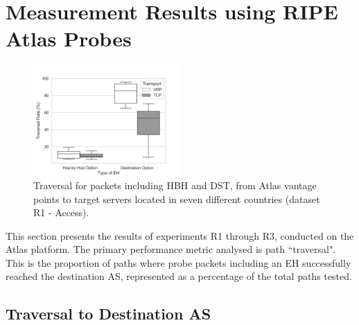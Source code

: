 \documentclass[conference]{IEEEtran}
\begin{document}




\section{Measurement Results using RIPE Atlas Probes} 
\label{sec:ripe-results}

\begin{figure}[t]
\centering
  \includegraphics[width=0.5\textwidth]{all_traversal.png}
  \caption{Traversal for packets including HBH and DST, from Atlas vantage points to target servers located in seven different countries (dataset R1 - Access).}
  \label{fig:countrybox}
\end{figure}

This section presents the results of experiments R1 through R3, conducted on the Atlas platform. 
The primary performance metric analysed is path ``traversal".
This is the proportion of paths where probe packets including an EH
successfully reached the destination AS, represented as a percentage of the total paths tested.


\subsection{Traversal to Destination AS}
\end{document}
